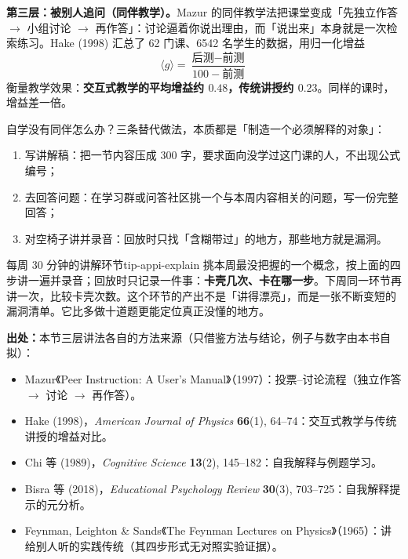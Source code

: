 \textbf{第三层：被别人追问（同伴教学）。}Mazur 的同伴教学法把课堂变成「先独立作答 $\to$ 小组讨论 $\to$ 再作答」：讨论逼着你说出理由，而「说出来」本身就是一次检索练习。Hake (1998) 汇总了 62 门课、6542 名学生的数据，用归一化增益
\begin{equation}
\langle g\rangle=\frac{\text{后测}-\text{前测}}{100-\text{前测}}
\end{equation}
衡量教学效果：\textbf{交互式教学的平均增益约 $0.48$，传统讲授约 $0.23$}。同样的课时，增益差一倍。

自学没有同伴怎么办？三条替代做法，本质都是「制造一个必须解释的对象」：
\begin{enumerate}[nosep,leftmargin=1.6em]
  \item 写讲解稿：把一节内容压成 $300$ 字，要求面向没学过这门课的人，不出现公式编号；
  \item 去回答问题：在学习群或问答社区挑一个与本周内容相关的问题，写一份完整回答；
  \item 对空椅子讲并录音：回放时只找「含糊带过」的地方，那些地方就是漏洞。
\end{enumerate}

\begin{tip}{每周 30 分钟的讲解环节}{tip-appi-explain}
挑本周最没把握的一个概念，按上面的四步讲一遍并录音；回放时只记录一件事：\textbf{卡壳几次、卡在哪一步}。下周同一环节再讲一次，比较卡壳次数。这个环节的产出不是「讲得漂亮」，而是一张不断变短的漏洞清单。它比多做十道题更能定位真正没懂的地方。
\end{tip}

\textbf{出处：}本节三层讲法各自的方法来源（只借鉴方法与结论，例子与数字由本书自拟）：
\begin{itemize}[nosep,leftmargin=1.6em]
  \item Mazur《Peer Instruction: A User's Manual》（1997）：投票--讨论流程（独立作答 $\to$ 讨论 $\to$ 再作答）。
\item Hake (1998)，\textit{American Journal of Physics} \textbf{66}(1), 64--74：交互式教学与传统讲授的增益对比。
\item Chi 等 (1989)，\textit{Cognitive Science} \textbf{13}(2), 145--182：自我解释与例题学习。
\item Bisra 等 (2018)，\textit{Educational Psychology Review} \textbf{30}(3), 703--725：自我解释提示的元分析。
\item Feynman, Leighton \& Sands《The Feynman Lectures on Physics》（1965）：讲给别人听的实践传统（其四步形式无对照实验证据）。
\end{itemize}


